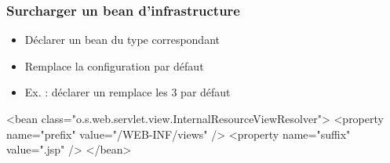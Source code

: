 \begin{frame}[fragile]
 \frametitle{Surcharger un bean d'infrastructure}
 
 \begin{itemize}
  \item Déclarer un bean du type correspondant
  \item Remplace la configuration par défaut
  \item Ex. : déclarer un  remplace les 3 par défaut
 \end{itemize} 

 \begin{xmlcode}
<bean class="o.s.web.servlet.view.InternalResourceViewResolver">
  <property name="prefix" value="/WEB-INF/views" />
  <property name="suffix" value=".jsp" />
</bean>
 \end{xmlcode}

\end{frame}